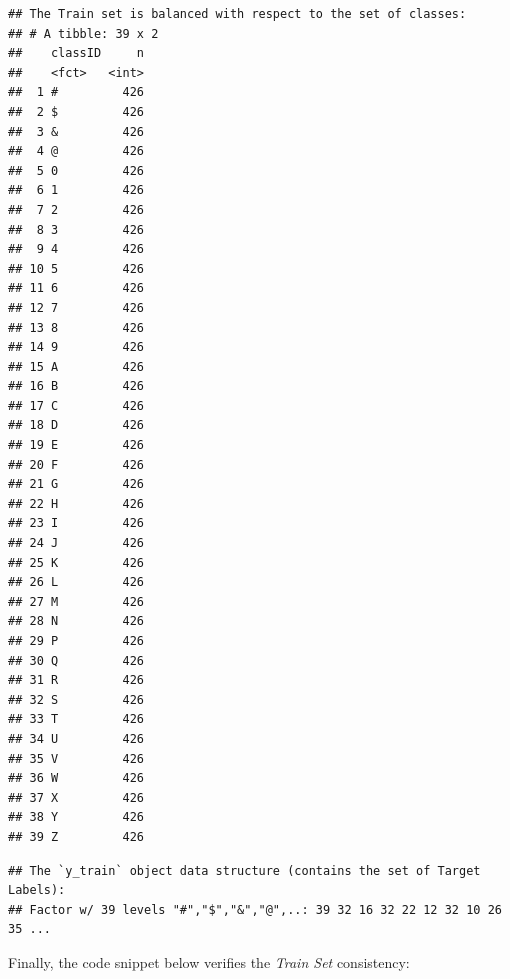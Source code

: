 \documentclass[
]{report}
\newenvironment{Shaded}{\begin{snugshade}}{\end{snugshade}}
\newcommand{\FunctionTok}[1]{\textcolor[rgb]{0.13,0.29,0.53}{\textbf{#1}}}
\newcommand{\NormalTok}[1]{#1}
\newcommand{\OtherTok}[1]{\textcolor[rgb]{0.56,0.35,0.01}{#1}}
\newcommand{\SpecialCharTok}[1]{\textcolor[rgb]{0.81,0.36,0.00}{\textbf{#1}}}
\begin{document}
\normalsize

\begin{Shaded}
\end{Shaded}

\footnotesize

\begin{verbatim}
## The Train set is balanced with respect to the set of classes:
## # A tibble: 39 x 2
##    classID     n
##    <fct>   <int>
##  1 #         426
##  2 $         426
##  3 &         426
##  4 @         426
##  5 0         426
##  6 1         426
##  7 2         426
##  8 3         426
##  9 4         426
## 10 5         426
## 11 6         426
## 12 7         426
## 13 8         426
## 14 9         426
## 15 A         426
## 16 B         426
## 17 C         426
## 18 D         426
## 19 E         426
## 20 F         426
## 21 G         426
## 22 H         426
## 23 I         426
## 24 J         426
## 25 K         426
## 26 L         426
## 27 M         426
## 28 N         426
## 29 P         426
## 30 Q         426
## 31 R         426
## 32 S         426
## 33 T         426
## 34 U         426
## 35 V         426
## 36 W         426
## 37 X         426
## 38 Y         426
## 39 Z         426
\end{verbatim}

\normalsize

\begin{Shaded}
\end{Shaded}

\footnotesize

\begin{verbatim}
## The `y_train` object data structure (contains the set of Target Labels):
## Factor w/ 39 levels "#","$","&","@",..: 39 32 16 32 22 12 32 10 26 35 ...
\end{verbatim}

\normalsize

Finally, the code snippet below verifies the \emph{Train Set} consistency:
\end{document}
